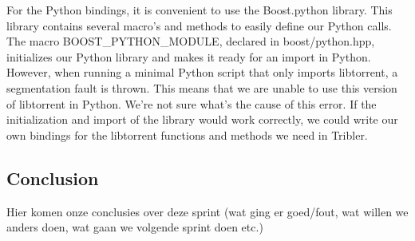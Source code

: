 				For the Python bindings, it is convenient to use the Boost.python library. This library contains several macro's and methods to easily define our Python calls. The macro BOOST\_PYTHON\_MODULE, declared in boost/python.hpp, initializes our Python library and makes it ready for an import in Python. However, when running a minimal Python script that only imports libtorrent, a segmentation fault is thrown. This means that we are unable to use this version of libtorrent in Python. We're not sure what's the cause of this error. If the initialization and import of the library would work correctly, we could write our own bindings for the libtorrent functions and methods we need in Tribler.
			
	\subsection{Conclusion}
		Hier komen onze conclusies over deze sprint (wat ging er goed/fout, wat willen we anders doen, wat gaan we volgende sprint doen etc.)
